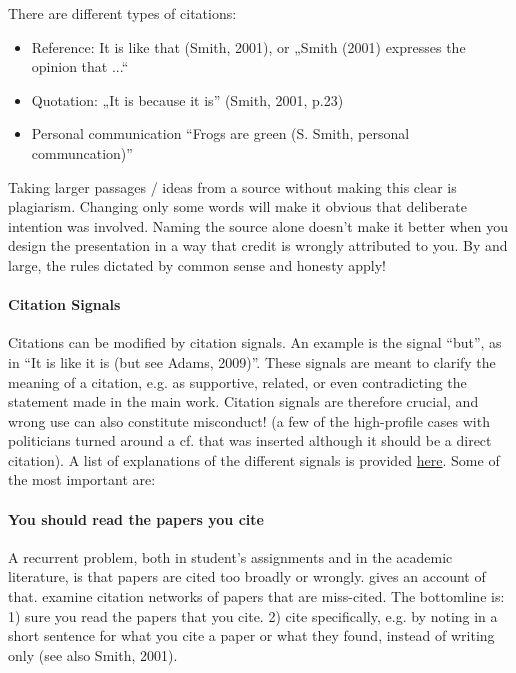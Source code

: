 \documentclass{tufte-book}
\begin{document}
There are different types of citations:

\begin{itemize}
\item Reference: It is like that (Smith, 2001), or „Smith (2001) expresses the opinion that ...“
\item Quotation: „It is because it is” (Smith, 2001, p.23)
\item Personal communication “Frogs are green (S. Smith, personal communcation)”
\end{itemize}

Taking larger passages / ideas from a source without making this clear is plagiarism. Changing only some words will make it obvious that deliberate intention was involved. Naming the source alone doesn’t make it better when you design the presentation in a way that credit is wrongly attributed to you. By and large, the rules dictated by common sense and honesty apply!

\paragraph{Citation Signals} Citations can be modified by citation signals. An example is the signal ``but'', as in ``It is like it is (but see Adams, 2009)”. These signals are meant to clarify the meaning of a citation, e.g. as supportive, related, or even contradicting the statement made in the main work. Citation signals are therefore crucial, and wrong use can also constitute misconduct! (a few of the high-profile cases with politicians turned around a cf. that was inserted although it should be a direct citation). A list of explanations of the different signals is provided \href{http://en.wikipedia.org/wiki/Citation_signal}{here}. Some of the most important are:

\paragraph{You should read the papers you cite} A recurrent problem, both in student's assignments and in the academic literature, is that papers are cited too broadly or wrongly. \citet{Editorial-Causecorrelationconjecture-2015} gives an account of that. \citet{Greenberg-Howcitationdistortions-2009} examine citation networks of papers that are miss-cited. The bottomline is: 1) sure you read the papers that you cite. 2) cite specifically, e.g. by noting in a short sentence for what you cite a paper or what they found, instead of writing only (see also Smith, 2001). 
\end{document}

